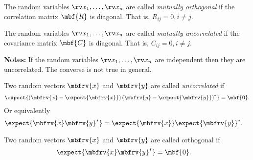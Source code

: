 \begin{definitionBox}
    The random variables $\stringRVs{x}{n}$ are called \emph{mutually orthogonal} if the correlation matrix $\mbf{R}$ is diagonal. That is, $R_{ij}=0, i\neq j$.
\end{definitionBox}
\begin{definitionBox}
    The random variables $\stringRVs{x}{n}$ are called \emph{mutually uncorrelated} if the covariance matrix $\mbf{C}$ is diagonal. That is, $C_{ij}=0, i\neq j$.
\end{definitionBox}

\begin{myBlueBox}
    \textbf{Notes:} If the random variables $\stringRVs{x}{n}$ are independent then they are uncorrelated. The converse is not true in general.
\end{myBlueBox}

\begin{definitionBox}
    Two random vectors $\mbfrv{x}$ and $\mbfrv{y}$  are called \emph{uncorrelated} if 
    \begin{align}
        \expect{\left(\mbfrv{x}-\expect{\mbfrv{x}}\right)\left(\mbfrv{y}-\expect{\mbfrv{y}}\right)^{\herm}}=\mbf{0}.
    \end{align}
    Or equivalently
    \begin{align}
        \expect{\mbfrv{x}\mbfrv{y}^{\herm}} &= \expect{\mbfrv{x}}\expect{\mbfrv{y}}^{\herm}.
    \end{align}
\end{definitionBox}
\begin{definitionBox}
    Two random vectors $\mbfrv{x}$ and $\mbfrv{y}$ are called orthogonal if 
    \begin{align}
        \expect{\mbfrv{x}\mbfrv{y}^{\herm}} &= \mbf{0}.
    \end{align}
\end{definitionBox}

